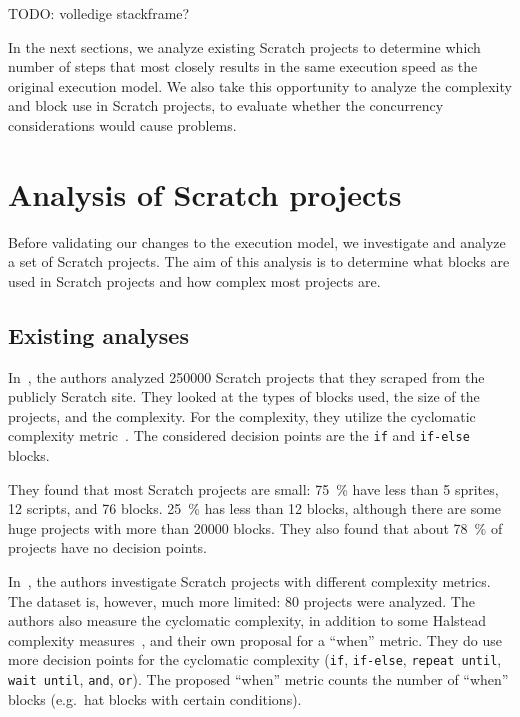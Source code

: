 \documentclass[../main]{subfiles}
\begin{document}
TODO: volledige stackframe?

In the next sections, we analyze existing Scratch projects to determine which number of steps that most closely results in the same execution speed as the original execution model.
We also take this opportunity to analyze the complexity and block use in Scratch projects, to evaluate whether the concurrency considerations would cause problems.

\section{Analysis of Scratch projects}\label{sec:evaluation-of-scratch-projects}

Before validating our changes to the execution model, we investigate and analyze a set of Scratch projects.
The aim of this analysis is to determine what blocks are used in Scratch projects and how complex most projects are.

\subsection{Existing analyses}\label{subsec:existing-analyses}

In~\autocite{aivaloglouHowKidsCode2016}, the authors analyzed \num{250000} Scratch projects that they scraped from the publicly Scratch site.
They looked at the types of blocks used, the size of the projects, and the complexity.
For the complexity, they utilize the cyclomatic complexity metric~\autocite{mccabeComplexityMeasure1976}.
The considered decision points are the \texttt{if} and \texttt{if-else} blocks.

They found that most Scratch projects are small: \qty{75}{\percent} have less than 5 sprites, 12 scripts, and 76 blocks.
\qty{25}{\percent} has less than 12 blocks, although there are some huge projects with more than \num{20000} blocks.
They also found that about \qty{78}{\percent} of projects have no decision points.

In~\autocite{fronzaApproachEvaluateComplexity2020}, the authors investigate Scratch projects with different complexity metrics.
The dataset is, however, much more limited: 80 projects were analyzed.
The authors also measure the cyclomatic complexity, in addition to some Halstead complexity measures~\autocite{halsteadElementsSoftwareScience1977}, and their own proposal for a ``when'' metric.
They do use more decision points for the cyclomatic complexity (\texttt{if}, \texttt{if-else}, \texttt{repeat until}, \texttt{wait until}, \texttt{and}, \texttt{or}).
The proposed ``when'' metric counts the number of ``when'' blocks (e.g.\ hat blocks with certain conditions).
\end{document}
